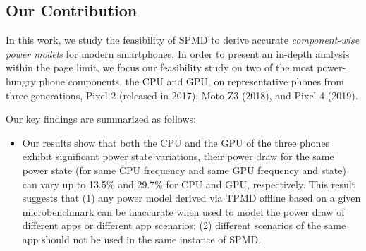 \subsection{Our Contribution}
\label{subsec:contri}


In this work, we study the feasibility of SPMD to derive 
accurate {\it component-wise power models} for modern smartphones.
In order to present an in-depth analysis within  the  page limit, 
we focus our feasibility study on two of the most power-hungry 
phone components, the CPU and GPU, on representative phones from three generations, 
Pixel 2 (released in 2017), Moto Z3 (2018), and Pixel 4 (2019).

Our key findings are summarized as follows:
\begin{itemize}
\item 
	Our results show that both the CPU and the GPU of the 
three phones exhibit significant power state variations, \ie their 
power draw for the same power state (for same CPU frequency and same 
GPU frequency and state) can vary up to  13.5\% and 29.7\% for CPU and GPU, respectively.
This result suggests that (1) any power model derived via 
TPMD offline based on a given microbenchmark 
can be inaccurate when used to model the power draw of 
different apps or different app scenarios;
(2) different scenarios of the same app should not be used in 
the same instance of SPMD. 
    
%


\end{itemize}
